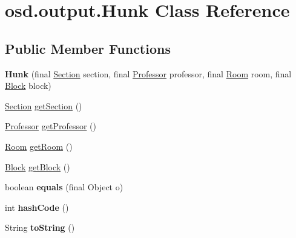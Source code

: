 \hypertarget{classosd_1_1output_1_1_hunk}{\section{osd.\-output.\-Hunk Class Reference}
\label{classosd_1_1output_1_1_hunk}
}
\subsection*{Public Member Functions}
\begin{DoxyCompactItemize}
\item 
\hypertarget{classosd_1_1output_1_1_hunk_a2afad4ffedd8f198524b9890243dc1c9}{{\bfseries Hunk} (final \hyperlink{interfaceosd_1_1input_1_1_section}{Section} section, final \hyperlink{interfaceosd_1_1input_1_1_professor}{Professor} professor, final \hyperlink{interfaceosd_1_1input_1_1_room}{Room} room, final \hyperlink{interfaceosd_1_1input_1_1_block}{Block} block)}\label{classosd_1_1output_1_1_hunk_a2afad4ffedd8f198524b9890243dc1c9}

\item 
\hyperlink{interfaceosd_1_1input_1_1_section}{Section} \hyperlink{classosd_1_1output_1_1_hunk_a4ae048a129a226f5e0f90d42a1fb9070}{get\-Section} ()
\item 
\hyperlink{interfaceosd_1_1input_1_1_professor}{Professor} \hyperlink{classosd_1_1output_1_1_hunk_aad86f22e8a5009d281d3a3ca0bf0f823}{get\-Professor} ()
\item 
\hyperlink{interfaceosd_1_1input_1_1_room}{Room} \hyperlink{classosd_1_1output_1_1_hunk_aec452e382d14f30e6da72e63e647eae3}{get\-Room} ()
\item 
\hyperlink{interfaceosd_1_1input_1_1_block}{Block} \hyperlink{classosd_1_1output_1_1_hunk_a58a55628703e1f9ac88f14f0cbf09bcb}{get\-Block} ()
\item 
\hypertarget{classosd_1_1output_1_1_hunk_a843591462a1402c08cb41c2c598c1ad7}{boolean {\bfseries equals} (final Object o)}\label{classosd_1_1output_1_1_hunk_a843591462a1402c08cb41c2c598c1ad7}

\item 
\hypertarget{classosd_1_1output_1_1_hunk_add37c82837cda95f356962de06d0c8eb}{int {\bfseries hash\-Code} ()}\label{classosd_1_1output_1_1_hunk_add37c82837cda95f356962de06d0c8eb}

\item 
\hypertarget{classosd_1_1output_1_1_hunk_a5d3057c83b319668ddee8a9dcd7204f3}{String {\bfseries to\-String} ()}\label{classosd_1_1output_1_1_hunk_a5d3057c83b319668ddee8a9dcd7204f3}


\end{DoxyCompactItemize}
